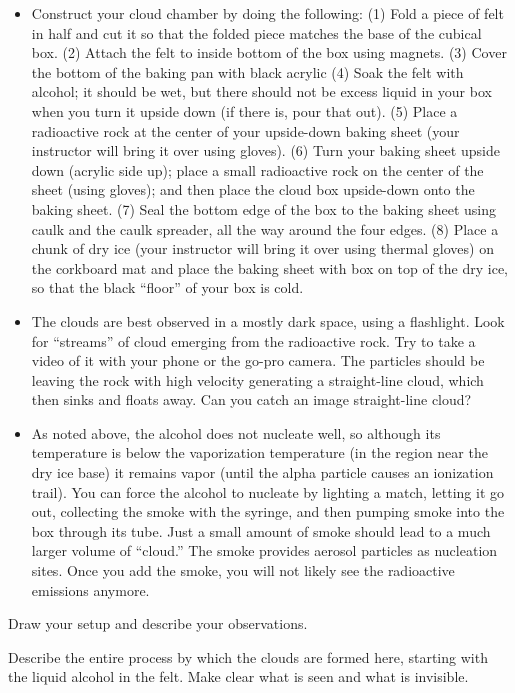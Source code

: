 	\begin{itemize}
	\item Construct your cloud chamber by doing the following: (1) Fold a piece of felt in half and cut it so that the folded piece matches the base of the cubical box. (2) Attach the felt to inside bottom of the box using magnets. (3) Cover the bottom of the baking pan with black acrylic (4) Soak the felt with alcohol; it should be wet, but there should not be excess liquid in your box when you turn it upside down (if there is, pour that out). (5) Place a radioactive rock at the center of your upside-down baking sheet (your instructor will bring it over using gloves). (6) Turn your baking sheet upside down (acrylic side up); place a small radioactive rock on the center of the sheet (using gloves); and then place the cloud box upside-down onto the baking sheet. (7) Seal the bottom edge of the box to the baking sheet using caulk and the caulk spreader, all the way around the four edges.  (8) Place a chunk of dry ice (your instructor will bring it over using thermal gloves) on the corkboard mat and place the baking sheet  with box on top of the dry ice, so that the black ``floor'' of your box is cold.
	\item The clouds are best observed in a mostly dark space, using a flashlight. Look for ``streams'' of cloud emerging from the radioactive rock.  Try to take a video of it with your phone or the go-pro camera.  The particles should be leaving the rock with high velocity generating a straight-line cloud, which then sinks and floats away.  Can you catch an image straight-line cloud?
	\item As noted above, the alcohol does not nucleate well, so although its temperature is below the vaporization temperature (in the region near the dry ice base) it remains vapor (until the alpha particle causes an ionization trail).  You can force the alcohol to nucleate by lighting a match, letting it go out, collecting the smoke with the syringe, and then pumping smoke into the box through its tube.  Just a small amount of smoke should lead to a much larger volume of ``cloud.''  The smoke provides aerosol particles as nucleation sites.  Once you add the smoke, you will not likely see the radioactive emissions anymore.
	\end{itemize}
Draw your setup and describe your observations.  

\answerspace[7cm]
	
\noindent Describe the entire process by which the clouds are formed here, starting with the liquid alcohol in the felt.  Make clear what is seen and what is invisible.

